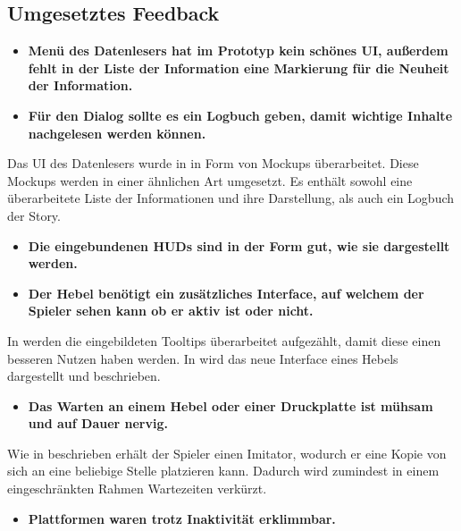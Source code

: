 \subsection{Umgesetztes Feedback}

\begin{itemize}  
    \item \textbf{Menü des Datenlesers hat im Prototyp kein schönes \ac{UI}, außerdem fehlt in der Liste der Information eine Markierung für die Neuheit der Information.}
    \item \textbf{Für den Dialog sollte es ein Logbuch geben, damit wichtige Inhalte nachgelesen werden können.}
\end{itemize}

Das \ac{UI} des Datenlesers wurde in  in Form von Mockups überarbeitet. Diese Mockups werden in einer ähnlichen Art umgesetzt. Es enthält sowohl eine überarbeitete Liste der Informationen und ihre Darstellung, als auch ein Logbuch der Story.

\begin{itemize}  
    \item \textbf{Die eingebundenen  \ac{HUD}s sind in der Form gut, wie sie dargestellt werden.}
    \item \textbf{Der Hebel benötigt ein zusätzliches Interface, auf welchem der Spieler sehen kann ob er aktiv ist oder nicht.}
\end{itemize}

In  werden die eingebildeten Tooltips überarbeitet aufgezählt, damit diese einen besseren Nutzen haben werden. In  wird das neue Interface eines Hebels dargestellt und beschrieben.

\begin{itemize}  
    \item \textbf{Das Warten an einem Hebel oder einer Druckplatte ist mühsam und auf Dauer nervig.}
\end{itemize}

Wie in  beschrieben erhält der Spieler einen Imitator, wodurch er eine Kopie von sich an eine beliebige Stelle platzieren kann. Dadurch wird zumindest in einem eingeschränkten Rahmen Wartezeiten verkürzt.

\begin{itemize}  
    \item \textbf{Plattformen waren trotz Inaktivität erklimmbar.}
\end{itemize}

